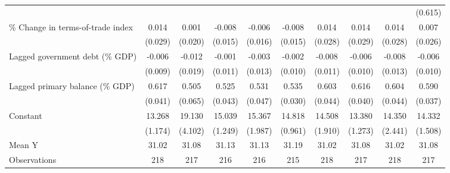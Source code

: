 {\begin{tabular}{l*{9}{c}}
                    &                     &                     &                     &                     &                     &                     &                     &                     &     (0.615)         \\
\addlinespace
\% Change in terms-of-trade index&       0.014         &       0.001         &      -0.008         &      -0.006         &      -0.008         &       0.014         &       0.014         &       0.014         &       0.007         \\
                    &     (0.029)         &     (0.020)         &     (0.015)         &     (0.016)         &     (0.015)         &     (0.028)         &     (0.029)         &     (0.028)         &     (0.026)         \\
\addlinespace
Lagged government debt (\% GDP)&      -0.006         &      -0.012         &      -0.001         &      -0.003         &      -0.002         &      -0.008         &      -0.006         &      -0.008         &      -0.006         \\
                    &     (0.009)         &     (0.019)         &     (0.011)         &     (0.013)         &     (0.010)         &     (0.011)         &     (0.010)         &     (0.013)         &     (0.010)         \\
\addlinespace
Lagged primary balance (\% GDP)&       0.617\sym{***}&       0.505\sym{***}&       0.525\sym{***}&       0.531\sym{***}&       0.535\sym{***}&       0.603\sym{***}&       0.616\sym{***}&       0.604\sym{***}&       0.590\sym{***}\\
                    &     (0.041)         &     (0.065)         &     (0.043)         &     (0.047)         &     (0.030)         &     (0.044)         &     (0.040)         &     (0.044)         &     (0.037)         \\
\addlinespace
Constant            &      13.268\sym{***}&      19.130\sym{***}&      15.039\sym{***}&      15.367\sym{***}&      14.818\sym{***}&      14.508\sym{***}&      13.380\sym{***}&      14.350\sym{***}&      14.332\sym{***}\\
                    &     (1.174)         &     (4.102)         &     (1.249)         &     (1.987)         &     (0.961)         &     (1.910)         &     (1.273)         &     (2.441)         &     (1.508)         \\
\midrule
Mean Y              &       31.02         &       31.08         &       31.13         &       31.13         &       31.19         &       31.02         &       31.08         &       31.02         &       31.08         \\
Observations        &         218         &         217         &         216         &         216         &         215         &         218         &         217         &         218         &         217         \\
\bottomrule
\end{tabular}
}
